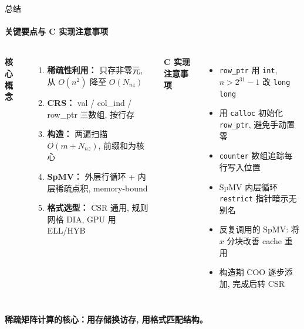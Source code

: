 \documentclass[12pt,aspectratio=169]{beamer}
\begin{document}
\begin{frame}[shrink]{总结}
\framesubtitle{关键要点与 C 实现注意事项}

\footnotesize
\begin{columns}[T]
\textbf{核心概念}
\begin{enumerate}\itemsep1pt
  \item \textbf{稀疏性利用：} 只存非零元, 从 $O(n^2)$ 降至 $O(N_{\!nz})$
  \item \textbf{CRS：} val / col\_ind / row\_ptr 三数组, 按行存
  \item \textbf{构造：} 两遍扫描 $O(m+N_{\!nz})$, 前缀和为核心
  \item \textbf{SpMV：} 外层行循环 + 内层稀疏点积, memory-bound
  \item \textbf{格式选型：} CSR 通用, 规则网格 DIA, GPU 用 ELL/HYB
\end{enumerate}

\textbf{C 实现注意事项}
\begin{itemize}\itemsep1pt
  \item \texttt{row\_ptr} 用 \texttt{int}, $n>2^{31}{-}1$ 改 \texttt{long long}
  \item 用 \texttt{calloc} 初始化 \texttt{row\_ptr}, 避免手动置零
  \item \texttt{counter} 数组追踪每行写入位置
  \item SpMV 内层循环 \texttt{restrict} 指针暗示无别名
  \item 反复调用的 SpMV: 将 $x$ 分块改善 cache 重用
  \item 构造期 COO 逐步添加, 完成后转 CSR
\end{itemize}
\end{columns}
\normalsize

\vspace{6pt}
\begin{center}
\textbf{稀疏矩阵计算的核心：用存储换访存, 用格式匹配结构。}
\end{center}
\end{frame}
\end{document}
